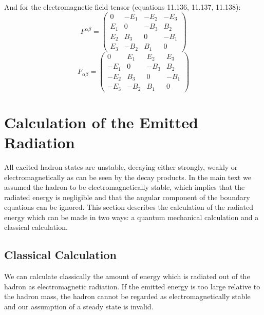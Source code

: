 \documentclass[11pt,a4paper]{article}
\begin{document}
And for the electromagnetic field tensor (equations 11.136, 11.137, 11.138):
\begin{equation*}
F^{\alpha\beta}=\left(\begin{array}{cccc}
0 & -E_{1} & -E_{2} & -E_{3}\\
E_{1} & 0 & -B_{3} & B_{2}\\
E_{2} & B_{3} & 0 & -B_{1}\\
E_{3} & -B_{2} & B_{1} & 0
\end{array}\right)
\end{equation*}
\begin{equation*}
F_{\alpha\beta}=\left(\begin{array}{cccc}
0 & E_{1} & E_{2} & E_{3}\\
-E_{1} & 0 & -B_{3} & B_{2}\\
-E_{2} & B_{3} & 0 & -B_{1}\\
-E_{3} & -B_{2} & B_{1} & 0
\end{array}\right)
\end{equation*}
\FloatBarrier

\section{Calculation of the Emitted Radiation}
\label{sec:radiation}

All excited hadron states are unstable, decaying either strongly, weakly or electromagnetically as can be seen by the decay products. In the main text we assumed the hadron to be electromagnetically stable, which implies that the radiated energy is negligible and that the angular component of the boundary equations can be ignored. This section describes the calculation of the radiated energy which can be made in two ways: a quantum mechanical calculation and a classical calculation.

\subsection{Classical Calculation}

We can calculate classically the amount of energy which is radiated out of the hadron as electromagnetic radiation. If the emitted energy is too large relative to the hadron mass, the hadron cannot be regarded as electromagnetically stable and our assumption of a steady state is invalid.
\end{document}
